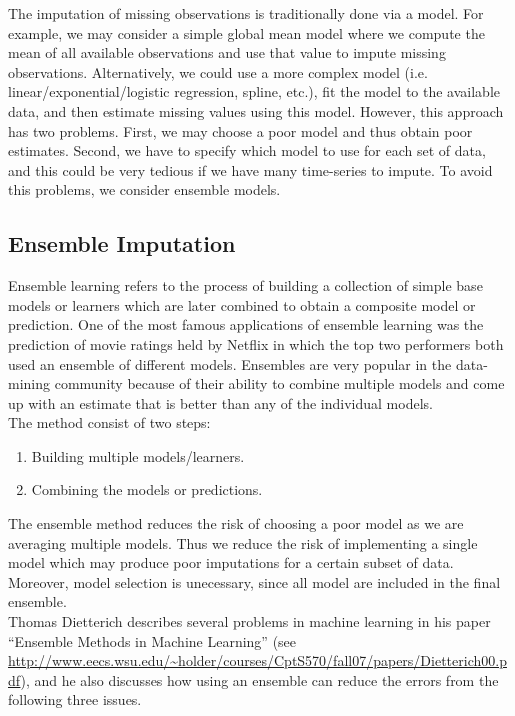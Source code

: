 \documentclass[nojss]{jss}\usepackage[]{graphicx}\usepackage[]{color}
\begin{document}
The imputation of missing observations is traditionally done via a model.  For example, we may consider a simple global mean model where we compute the mean of all available observations and use that value to impute missing observations.  Alternatively, we could use a more complex model (i.e. linear/exponential/logistic regression, spline, etc.), fit the model to the available data, and then estimate missing values using this model.  However, this approach has two problems.  First, we may choose a poor model and thus obtain poor estimates.  Second, we have to specify which model to use for each set of data, and this could be very tedious if we have many time-series to impute.  To avoid this problems, we consider ensemble models.

\subsection{Ensemble Imputation}

Ensemble learning refers to the process of building a collection of
simple base models or learners which are later combined to obtain a
composite model or prediction.  One of the most famous applications of ensemble learning was the prediction of movie ratings held by Netflix in which the
top two performers both used an ensemble of different models.  Ensembles are very popular in the data-mining community because of their ability to combine multiple models and come up with an estimate that is better than any of the individual models.\\

The method consist of two steps:
\begin{enumerate}
  \item Building multiple models/learners.
  \item Combining the models or predictions.
\end{enumerate}

The ensemble method reduces the risk of choosing a poor model as we are averaging multiple models.  Thus we reduce the risk of implementing a single model which may produce poor imputations for a certain subset of data. Moreover, model selection is unecessary, since all model are included in the final ensemble.\\

Thomas Dietterich describes several problems in machine learning in his paper ``Ensemble Methods in Machine Learning'' (see \url{http://www.eecs.wsu.edu/~holder/courses/CptS570/fall07/papers/Dietterich00.pdf}), and he also discusses how using an ensemble can reduce the errors from the following three issues.
\end{document}
